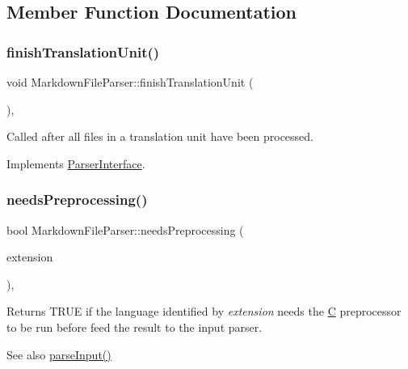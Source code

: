 \subsection{Member Function Documentation}
\mbox{\label{class_markdown_file_parser_adaf4aeedc27abe4dd8cc4a58d59b298f}} 
\subsubsection{\texorpdfstring{finishTranslationUnit()}{finishTranslationUnit()}}
{\footnotesize\ttfamily void Markdown\+File\+Parser\+::finish\+Translation\+Unit (\begin{DoxyParamCaption}{ }\end{DoxyParamCaption})\hspace{0.3cm}{\ttfamily [inline]}, {\ttfamily [virtual]}}

Called after all files in a translation unit have been processed. 

Implements \mbox{\hyperlink{class_parser_interface_af3acd64c6a33852e2e46e7288eb9c9cf}{Parser\+Interface}}.

\mbox{\label{class_markdown_file_parser_ae53b811156b426b03f4ea8f634141133}} 
\subsubsection{\texorpdfstring{needsPreprocessing()}{needsPreprocessing()}}
{\footnotesize\ttfamily bool Markdown\+File\+Parser\+::needs\+Preprocessing (\begin{DoxyParamCaption}\item[{const \mbox{\hyperlink{class_q_c_string}{Q\+C\+String}} \&}]{extension }\end{DoxyParamCaption})\hspace{0.3cm}{\ttfamily [inline]}, {\ttfamily [virtual]}}

Returns T\+R\+UE if the language identified by {\itshape extension} needs the \mbox{\hyperlink{class_c}{C}} preprocessor to be run before feed the result to the input parser. \begin{DoxySeeAlso}{See also}
\mbox{\hyperlink{class_markdown_file_parser_a56e4994924ce8ac7710e2a1da0f98807}{parse\+Input()}} 
\end{DoxySeeAlso}



